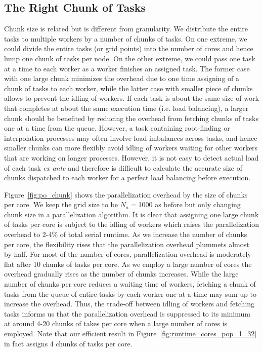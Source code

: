 \documentclass[12pt]{article}
\begin{document}
\subsection{The Right Chunk of Tasks}
Chunk size is related but is different from granularity. We distribute the entire tasks to multiple workers by a number of chunks of tasks. On one extreme, we could divide the entire tasks (or grid points) into the number of cores and hence lump one chunk of tasks per node. On the other extreme, we could pass one task at a time to each worker as a worker finishes an assigned task. The former case with one large chunk minimizes the overhead due to one time assigning of a chunk of tasks to each worker, while the latter case with smaller piece of chunks allows to prevent the idling of workers. If each task is about the same size of work that completes at about the same execution time (i.e. load balancing), a larger chunk should be benefited by reducing the overhead from fetching chunks of tasks one at a time from the queue. However, a task containing root-finding or interpolation processes may often involve load imbalances across tasks, and hence smaller chunks can more flexibly avoid idling of workers waiting for other workers that are working on longer processes. However, it is not easy to detect actual load of each task \textit{ex ante} and therefore is difficult to calculate the accurate size of chunks dispatched to each worker for a perfect load balancing before execution.

Figure~\ref{fig:po_chunk} shows the parallelization overhead by the size of chunks per core. We keep the grid size to be $N_a=$1000 as before but only changing chunk size in a parallelization algorithm. It is clear that assigning one large chunk of tasks per core is subject to the idling of workers which raises the parallelization overhead to 2-4\% of total serial runtime. As we increase the number of chunks per core, the flexibility rises that the parallelization overhead plummets almost by half. For most of the number of cores, parallelization overhead is moderately flat after 10 chunks of tasks per core. As we employ a large number of cores the overhead gradually rises as the number of chunks increases. While the large number of chunks per core reduces a waiting time of workers, fetching a chunk of tasks from the queue of entire tasks by each worker one at a time may sum up to increase the overhead. Thus, the trade-off between idling of workers and fetching tasks informs us that the parallelization overhead is suppressed to its minimum at around 4-20 chunks of takes per core when a large number of cores is employed. Note that our efficient result in Figure~\ref{fig:runtime_cores_pop_1_32} in fact assigns 4 chunks of tasks per core.
\end{document}
